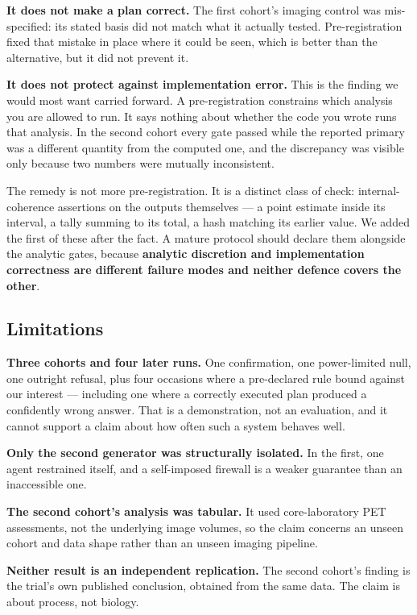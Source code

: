 \documentclass[11pt,a4paper]{article}
\begin{document}
\textbf{It does not make a plan correct.} The first cohort's imaging control was mis-specified: its
stated basis did not match what it actually tested. Pre-registration fixed that mistake in place
where it could be seen, which is better than the alternative, but it did not prevent it.

\textbf{It does not protect against implementation error.} This is the finding we would most want
carried forward. A pre-registration constrains which analysis you are allowed to run. It says
nothing about whether the code you wrote runs that analysis. In the second cohort every gate passed
while the reported primary was a different quantity from the computed one, and the discrepancy was
visible only because two numbers were mutually inconsistent.

The remedy is not more pre-registration. It is a distinct class of check: internal-coherence
assertions on the outputs themselves --- a point estimate inside its interval, a tally summing to
its total, a hash matching its earlier value. We added the first of these after the fact. A mature
protocol should declare them alongside the analytic gates, because \textbf{analytic discretion and
implementation correctness are different failure modes and neither defence covers the other}.

\subsection{Limitations}

\textbf{Three cohorts and four later runs.} One confirmation, one power-limited null, one outright
refusal, plus four occasions where a pre-declared rule bound against our interest --- including one where a
correctly executed plan produced a confidently wrong answer. That is a
demonstration, not an evaluation, and it cannot support a claim about how often such a system
behaves well.

\textbf{Only the second generator was structurally isolated.} In the first, one agent restrained
itself, and a self-imposed firewall is a weaker guarantee than an inaccessible one.

\textbf{The second cohort's analysis was tabular.} It used core-laboratory PET assessments, not the
underlying image volumes, so the claim concerns an unseen cohort and data shape rather than an
unseen imaging pipeline.

\textbf{Neither result is an independent replication.} The second cohort's finding is the trial's
own published conclusion, obtained from the same data. The claim is about process, not biology.
\end{document}
